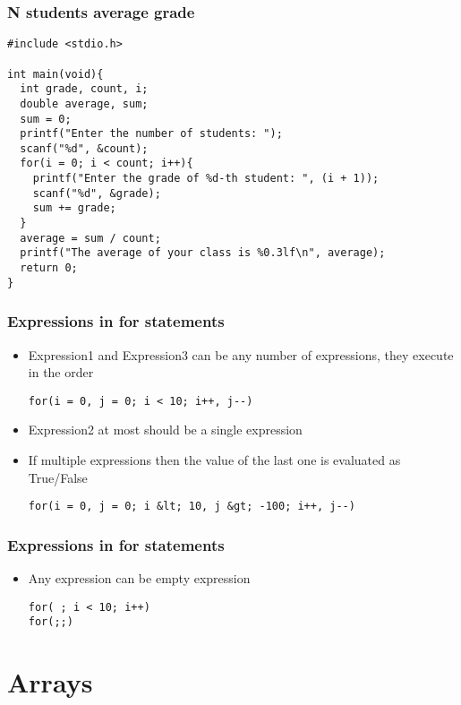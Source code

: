 \documentclass{../c-lecture}
\begin{document}
\begin{frame}[fragile]
  \frametitle{N students average grade}
  \begin{verbatim}
#include <stdio.h>

int main(void){
  int grade, count, i;
  double average, sum;
  sum = 0;
  printf("Enter the number of students: ");
  scanf("%d", &count);
  for(i = 0; i < count; i++){
    printf("Enter the grade of %d-th student: ", (i + 1));
    scanf("%d", &grade);
    sum += grade;
  }
  average = sum / count;
  printf("The average of your class is %0.3lf\n", average);
  return 0;
}
  \end{verbatim}
\end{frame}

\begin{frame}[fragile]
  \frametitle{Expressions in for statements}
  \begin{itemize}
    \item
      Expression1 and Expression3 can be any number of expressions, they execute
      in the order

    \begin{verbatim}
for(i = 0, j = 0; i < 10; i++, j--)
    \end{verbatim}
    \item Expression2 at most should be a single expression
    \item
      If multiple expressions then the value of the last one is evaluated as
      True/False

    \begin{verbatim}
for(i = 0, j = 0; i &lt; 10, j &gt; -100; i++, j--)
    \end{verbatim}
  \end{itemize}
\end{frame}

\begin{frame}
  \frametitle{Expressions in for statements}
  \begin{itemize}
    \item Any expression can be empty expression
    \begin{verbatim}
for( ; i < 10; i++)
for(;;)
    \end{verbatim}
  \end{itemize}
\end{frame}

\section{Arrays}
\end{document}
